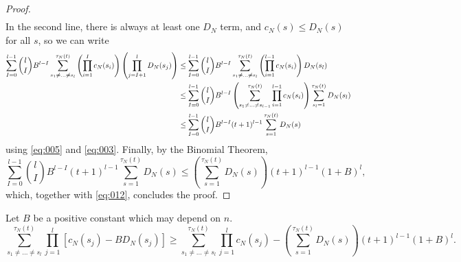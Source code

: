 \documentclass{article}
\newcommand{\1}[1]{\mathbbm{1}_{#1}}
\begin{document}
\begin{proof}
\begin{align}
\end{align}
In the second line, there is always at least one $D_N$ term, and $c_N(s) \leq D_N(s)$ for all $s$, so we can write
\begin{align}
\sum_{I=0}^{l-1}\binom{l}{I} B^{l-I} \sum_{s_1\neq\dots\neq s_l}^{\tau_N(t)}
        \left( \prod_{i=1}^I c_N(s_i) \right) \left( \prod_{j=I+1}^l D_N(s_j) \right)
&\leq \sum_{I=0}^{l-1}\binom{l}{I} B^{l-I} 
        \sum_{s_1\neq\dots\neq s_l}^{\tau_N(t)}
        \left( \prod_{i=1}^{l-1} c_N(s_i) \right) D_N(s_l) \notag\\
&\leq \sum_{I=0}^{l-1}\binom{l}{I} B^{l-I} 
        \left( \sum_{s_1\neq\dots\neq s_{l-1}}^{\tau_N(t)} 
        \prod_{i=1}^{l-1} c_N(s_i) \right) 
        \sum_{s_l=1}^{\tau_N(t)} D_N(s_l) \notag\\
&\leq \sum_{I=0}^{l-1}\binom{l}{I} B^{l-I} (t+1)^{l-1}
        \sum_{s=1}^{\tau_N(t)} D_N(s) \label{eq:013}
\end{align}
using \eqref{eq:005} and \eqref{eq:003}.
Finally, by the Binomial Theorem,
\begin{equation}\label{eq:014}
\sum_{I=0}^{l-1}\binom{l}{I} B^{l-I} (t+1)^{l-1}
        \sum_{s=1}^{\tau_N(t)} D_N(s)
\leq \left( \sum_{s=1}^{\tau_N(t)} D_N(s) \right) (t+1)^{l-1} (1+B)^l ,
\end{equation}
which, together with \eqref{eq:012}, concludes the proof.
\end{proof}


\begin{lemma}\label{thm:cleanup3}
Let $B$ be a positive constant which may depend on $n$.
\begin{equation}
\sum_{s_1\neq\dots\neq s_l}^{\tau_N(t)} \prod_{j=1}^l 
        \left[ c_N(s_j) - B D_N(s_j) \right]
\geq \sum_{s_1\neq\dots\neq s_l}^{\tau_N(t)} \prod_{j=1}^l c_N(s_j)
        - \left( \sum_{s=1}^{\tau_N(t)} D_N(s) \right) (t+1)^{l-1} (1+B)^l .
\end{equation}
\end{lemma}
\end{document}

